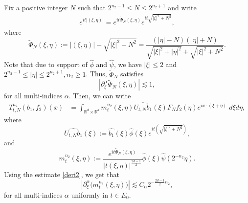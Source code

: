 \documentclass[a4paper,reqno]{amsart}
\numberwithin{equation}{section}
\newcommand{\R}{{\mathbb {R}}}
\begin{document}
	Fix a positive integer $N$ such that $2^{n_2-1}\leq N\leq2^{n_2+1}$ and write
	\begin{align*}
		e^{it|(\xi,\eta)|}=e^{it\tilde{\Phi}_N(\xi,\eta)}e^{it\sqrt{|\xi|^2+N^2}},
	\end{align*}
	where
	\[\tilde{\Phi}_N(\xi,\eta):=|(\xi,\eta)|-\sqrt{|\xi|^2+N^2}=\frac{(|\eta|-N)(|\eta|+N)}{\sqrt{|\xi|^2+|\eta|^2}+\sqrt{|\xi|^2+N^2}}.\]
	Note that due to support of $\widehat{\phi}$ and $\widehat{\psi}$, we have $|\xi|\leq2$ and $2^{n_2-1}\leq|\eta|\leq2^{n_2+1}, n_2\geq1$. Thus, $\tilde{\Phi}_N$ satisfies
	\begin{equation}\label{deri2}
		|\partial^\alpha_\xi\tilde{\Phi}_N(\xi,\eta)|\lesssim1,
	\end{equation}
	for all multi-indices $\alpha$. Then, we can write
	\begin{align*} T^{n_2}_{t,N}(b_1,f_2)(x)&=\int_{\R^d\times\R^d}m_t^{n_2}(\xi,\eta)\widehat{U_{t,N}b_1}(\xi)\widehat{F_Nf_2}(\eta)e^{ix\cdot(\xi+\eta)}\;d\xi d\eta,
	\end{align*}
	where
	\begin{equation*}\label{operatorU2}
		\widehat{U_{t,N}b_1}(\xi):=\widehat{b_1}(\xi) \widehat{\phi}\left(\xi\right) e^{it\left(\sqrt{|\xi|^2+N^{2}}\right)},
	\end{equation*}
	and
	\[m^{n_2}_{t}(\xi, \eta) :=\frac{e^{it\tilde{\Phi}_N(\xi,\eta)}}{|t(\xi,\eta)|^{\frac{2d-1}{2}}}\widehat{\phi}\left(\xi\right) \widehat{\psi}\left(2^{-n_2} \eta\right).\]
	Using the estimate \eqref{deri2}, we get that
	\begin{equation}\label{derivative2}
		|\partial^\alpha_\xi \big(m^{n_2}_{t}(\xi, \eta)\big)|\lesssim C_{\alpha}2^{-\frac{2d-1}{2}n_2}, 
	\end{equation}    
	for all multi-indices $\alpha$ uniformly in $t\in E_0$. 
	
\end{document}
